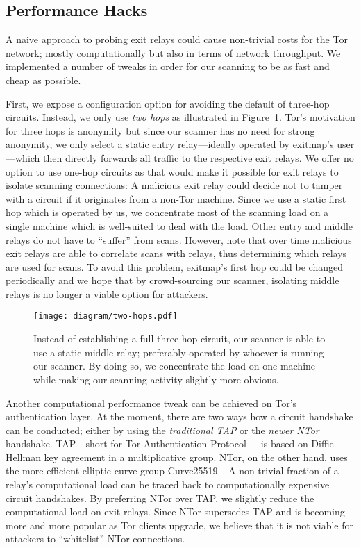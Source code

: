 \documentclass[letterpaper,twocolumn,10pt]{article}
\begin{document}
\subsection{Performance Hacks}
A naive approach to probing exit relays could cause non-trivial costs for the Tor network; mostly
computationally but also in terms of network throughput.  We implemented a number of tweaks in order
for our scanning to be as fast and cheap as possible.

First, we expose a configuration option for avoiding the default of three-hop circuits.  Instead, we
only use \emph{two hops} as illustrated in Figure~\ref{fig:twohops}.  Tor's motivation for three
hops is anonymity but since our scanner has no need for strong anonymity, we only select a static
entry relay---ideally operated by \textsf{exitmap}'s user---which then directly forwards all traffic
to the respective exit relays.  We offer no option to use one-hop circuits as that would make it
possible for exit relays to isolate scanning connections:  A malicious exit relay could decide not
to tamper with a circuit if it originates from a non-Tor machine.  Since we use a static first hop
which is operated by us, we concentrate most of the scanning load on a single machine which is
well-suited to deal with the load.  Other entry and middle relays do not have to ``suffer'' from
scans.  However, note that over time malicious exit relays are able to correlate scans with relays,
thus determining which relays are used for scans.  To avoid this problem, \textsf{exitmap}'s first
hop could be changed periodically and we hope that by crowd-sourcing our scanner, isolating middle
relays is no longer a viable option for attackers.

\begin{figure}[t]
	\centering
	\texttt{[image: diagram/two-hops.pdf]}
	\caption{Instead of establishing a full three-hop circuit, our scanner is able to use a static
		middle relay; preferably operated by whoever is running our scanner.  By doing so, we
		concentrate the load on one machine while making our scanning activity slightly more
		obvious.}
	\label{fig:twohops}
\end{figure}

Another computational performance tweak can be achieved on Tor's authentication layer.  At the
moment, there are two ways how a circuit handshake can be conducted; either by using the
\emph{traditional TAP} or the \emph{newer NTor} handshake.  TAP---short for Tor Authentication
Protocol~\cite{Goldberg2006}---is based on Diffie-Hellman key agreement in a multiplicative group.
NTor, on the other hand, uses the more efficient elliptic curve group
Curve25519~\cite{Bernstein2006}.  A non-trivial fraction of a relay's computational load can be
traced back to computationally expensive circuit handshakes.  By preferring NTor over TAP, we
slightly reduce the computational load on exit relays.  Since NTor supersedes TAP and is becoming
more and more popular as Tor clients upgrade, we believe that it is not viable for attackers to
``whitelist'' NTor connections.
\end{document}
